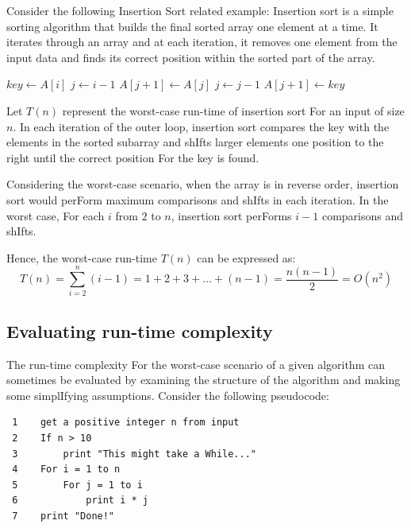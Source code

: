 \documentclass[12pt]{book} %
\begin{document}
Consider the following Insertion Sort related example:\newline
Insertion sort is a simple sorting algorithm that builds the final sorted array one element at a time. It iterates through an array and at each iteration, it removes one element from the input data and finds its correct position within the sorted part of the array.

\begin{algorithm}
\caption{Insertion Sort}
\begin{algorithmic}[1]
        \State $key \gets A[i]$
        \State $j \gets i - 1$
            \State $A[j + 1] \gets A[j]$
            \State $j \gets j - 1$
        \EndWhile
        \State $A[j + 1] \gets key$
    \EndFor
\EndProcedure
\end{algorithmic}
\end{algorithm}

Let $T(n)$ represent the worst-case run-time of insertion sort For an input of size $n$. In each iteration of the outer loop, insertion sort compares the key with the elements in the sorted subarray and shIfts larger elements one position to the right until the correct position For the key is found. 

Considering the worst-case scenario, when the array is in reverse order, insertion sort would perForm maximum comparisons and shIfts in each iteration. In the worst case, For each $i$ from $2$ to $n$, insertion sort perForms $i-1$ comparisons and shIfts.

Hence, the worst-case run-time $T(n)$ can be expressed as:
$$ T(n) = \sum_{i=2}^{n} (i - 1) = 1 + 2 + 3 + \dots + (n-1) = \frac{n(n-1)}{2} = O(n^2) $$




\subsection{Evaluating run-time complexity}

The run-time complexity For the worst-case scenario of a given algorithm can sometimes be evaluated by examining the structure of the algorithm and making some simplIfying assumptions.  Consider the following pseudocode:

\begin{verbatim}
 1    get a positive integer n from input
 2    If n > 10
 3        print "This might take a While..."
 4    For i = 1 to n
 5        For j = 1 to i
 6            print i * j
 7    print "Done!"
\end{verbatim}
\end{document}

